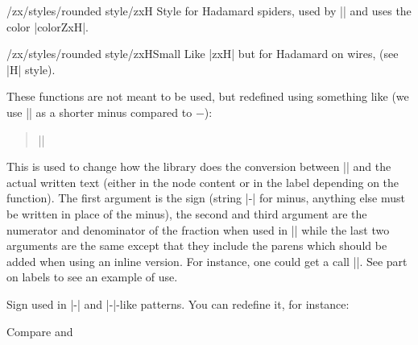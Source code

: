 \documentclass[a4paper]{ltxdoc}
\begin{document}
{\begin{stylekey}{/zx/styles/rounded style/zxH}
  Style for Hadamard spiders, used by |\zxH{}| and uses the color |colorZxH|.
\end{stylekey}

\begin{stylekey}{/zx/styles/rounded style/zxHSmall}
  Like |zxH| but for Hadamard on wires, (see |H| style).
\end{stylekey}

\begin{pgfmanualentry}
  \extractcommand\zxConvertToFracInContent{}\@@
  \extractcommand\zxConvertToFracInLabel\@@
  \pgfmanualbody
  These functions are not meant to be used, but redefined using something like (we use |\zxMinus| as a shorter minus compared to $-$):
\begin{verse}
  ||
\end{verse}
This is used to change how the library does the conversion between |\zxFrac| and the actual written text (either in the node content or in the label depending on the function). The first argument is the sign (string |-| for minus, anything else must be written in place of the minus), the second and third argument are the numerator and denominator of the fraction when used in |\frac{}{}| while the last two arguments are the same except that they include the parens which should be added when using an inline version. For instance, one could get a call ||. See part on labels to see an example of use.
\end{pgfmanualentry}

\begin{command}{\zxMinusInShort}
  Sign used in |\zxZ-{\alpha}| and |\zxX-{\alpha}|-like patterns. You can redefine it, for instance:
\begin{codeexample}[]
Compare {\def\zxMinusInShort{-}
  \zx{\zxZ-{\alpha}}
} and
{\def\zxMinusInShort{\zxMinus}
  \zx{\zxZ-{\alpha}}
}
\end{codeexample}
\end{command}

}
\end{document}
